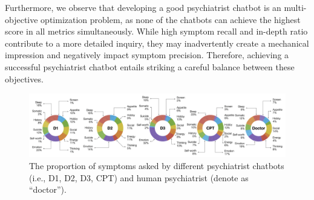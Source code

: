 Furthermore, we observe that developing a good psychiatrist chatbot is an multi-objective optimization problem, as none of the chatbots can achieve the highest score in all metrics simultaneously.
While high symptom recall and in-depth ratio contribute to a more detailed inquiry, they may inadvertently create a mechanical impression and negatively impact symptom precision. Therefore, achieving a successful psychiatrist chatbot entails striking a careful balance between these objectives.


\begin{figure}[th]
	\centering
	\includegraphics[width=\linewidth]{Figures/topics.png}
	\caption{The proportion of symptoms asked by different psychiatrist chatbots (i.e., D1, D2, D3, CPT) and human psychiatrist (denote as ``doctor'').}
	\label{fig:symp_anno}
\end{figure}


